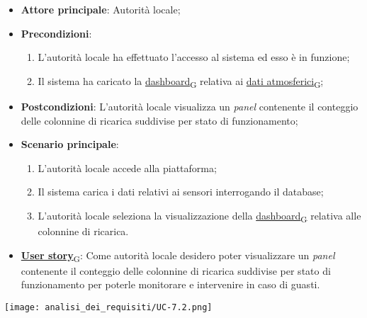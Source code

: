 \begin{itemize}
	\item \textbf{Attore principale}: Autorità locale;
	\item \textbf{Precondizioni}:
	      \begin{enumerate}
		      \item L'autorità locale ha effettuato l'accesso al sistema ed esso è in funzione;
		      \item Il sistema ha caricato la \href{https://7last.github.io/docs/rtb/documentazione-interna/glossario\#dashboard}{dashboard\textsubscript{G}} relativa ai \href{https://7last.github.io/docs/rtb/documentazione-interna/glossario\#dati-atmosferici}{dati atmosferici\textsubscript{G}};
	      \end{enumerate}
	\item \textbf{Postcondizioni}: L'autorità locale visualizza un \textit{panel} contenente il conteggio delle colonnine di ricarica suddivise per stato di funzionamento;
	\item \textbf{Scenario principale}:
	      \begin{enumerate}
		      \item L'autorità locale accede alla piattaforma;
		      \item Il sistema carica i dati relativi ai sensori interrogando il database;
		      \item L'autorità locale seleziona la visualizzazione della \href{https://7last.github.io/docs/rtb/documentazione-interna/glossario\#dashboard}{dashboard\textsubscript{G}} relativa alle colonnine di ricarica.
	      \end{enumerate}
	\item \href{https://7last.github.io/docs/rtb/documentazione-interna/glossario\#user-story}{\textbf{User story}\textsubscript{G}}:
	      Come autorità locale desidero poter visualizzare un \textit{panel} contenente il conteggio delle colonnine di ricarica suddivise per stato di funzionamento
	      per poterle monitorare e intervenire in caso di guasti.
\end{itemize}
\begin{center}
	\texttt{[image: analisi\_dei\_requisiti/UC-7.2.png]}
\end{center}

